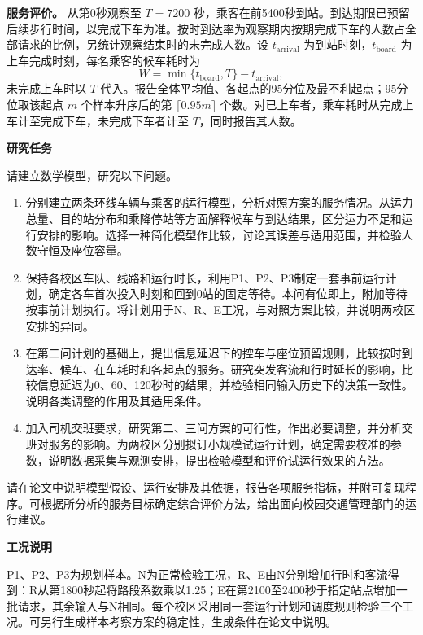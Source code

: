 \documentclass[11pt,a4paper]{article}
\begin{document}
\textbf{服务评价。} 从第0秒观察至 $T=7200$ 秒，乘客在前5400秒到站。到达期限已预留后续步行时间，以完成下车为准。按时到达率为观察期内按期完成下车的人数占全部请求的比例，另统计观察结束时的未完成人数。设 $t_{\mathrm{arrival}}$ 为到站时刻，$t_{\mathrm{board}}$ 为上车完成时刻，每名乘客的候车耗时为
\[
W=\min\{t_{\mathrm{board}},T\}-t_{\mathrm{arrival}},
\]
未完成上车时以 $T$ 代入。报告全体平均值、各起点的95分位及最不利起点；95分位取该起点 $m$ 个样本升序后的第 $\lceil0.95m\rceil$ 个数。对已上车者，乘车耗时从完成上车计至完成下车，未完成下车者计至 $T$，同时报告其人数。

\newpage
\begin{center}{\large\bfseries 研究任务}\end{center}

请建立数学模型，研究以下问题。
\begin{enumerate}
\item 分别建立两条环线车辆与乘客的运行模型，分析对照方案的服务情况。从运力总量、目的站分布和乘降停站等方面解释候车与到达结果，区分运力不足和运行安排的影响。选择一种简化模型作比较，讨论其误差与适用范围，并检验人数守恒及座位容量。
\item 保持各校区车队、线路和运行时长，利用P1、P2、P3制定一套事前运行计划，确定各车首次投入时刻和回到0站的固定等待。本问有位即上，附加等待按事前计划执行。将计划用于N、R、E工况，与对照方案比较，并说明两校区安排的异同。
\item 在第二问计划的基础上，提出信息延迟下的控车与座位预留规则，比较按时到达率、候车、在车耗时和各起点的服务。研究突发客流和行时延长的影响，比较信息延迟为0、60、120秒时的结果，并检验相同输入历史下的决策一致性。说明各类调整的作用及其适用条件。
\item 加入司机交班要求，研究第二、三问方案的可行性，作出必要调整，并分析交班对服务的影响。为两校区分别拟订小规模试运行计划，确定需要校准的参数，说明数据采集与观测安排，提出检验模型和评价试运行效果的方法。
\end{enumerate}

请在论文中说明模型假设、运行安排及其依据，报告各项服务指标，并附可复现程序。可根据所分析的服务目标确定综合评价方法，给出面向校园交通管理部门的运行建议。

\bigskip
\noindent\textbf{工况说明}

P1、P2、P3为规划样本。N为正常检验工况，R、E由N分别增加行时和客流得到：R从第1800秒起将路段系数乘以1.25；E在第2100至2400秒于指定站点增加一批请求，其余输入与N相同。每个校区采用同一套运行计划和调度规则检验三个工况。可另行生成样本考察方案的稳定性，生成条件在论文中说明。
\end{document}
